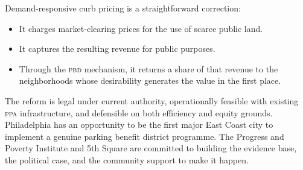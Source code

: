 \documentclass[11pt, letterpaper]{article}
\newcommand{\pbd}{\textsc{pbd}}
\newcommand{\ppa}{\textsc{ppa}}
\begin{document}
Demand-responsive curb pricing is a straightforward correction:
\begin{itemize}
  \item It charges market-clearing prices for the use of scarce public land.
  \item It captures the resulting revenue for public purposes.
  \item Through the \pbd{} mechanism, it returns a share of that revenue to
        the neighborhoods whose desirability generates the value in the first
        place.
\end{itemize}

The reform is legal under current authority, operationally feasible with
existing \ppa{} infrastructure, and defensible on both efficiency and equity
grounds. Philadelphia has an opportunity to be the first major East Coast city
to implement a genuine parking benefit district programme. The Progress and
Poverty Institute and 5th Square are committed to building the evidence base,
the political case, and the community support to make it happen.

\clearpage
\end{document}
